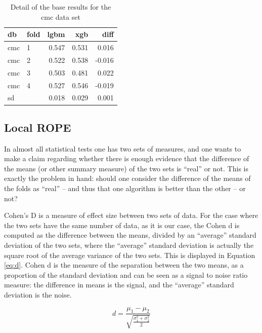 \documentclass[twoside,11pt,preprint]{article}
\begin{document}
\begin{table}

\caption{\label{tab:xsmall2}\label{tab:small2}Detail of the base results for the cmc data set}
\centering
\begin{tabular}[t]{llrrr}
\toprule
\textbf{db} & \textbf{fold} & \textbf{lgbm} & \textbf{xgb} & \textbf{diff}\\
\midrule
cmc & 1 & 0.547 & 0.531 & 0.016\\
cmc & 2 & 0.522 & 0.538 & -0.016\\
cmc & 3 & 0.503 & 0.481 & 0.022\\
cmc & 4 & 0.527 & 0.546 & -0.019\\
sd &  & 0.018 & 0.029 & 0.001\\
\bottomrule
\end{tabular}
\end{table}

\hypertarget{local-rope}{%
\subsection{\texorpdfstring{Local ROPE \label{localrope}}{Local ROPE }}\label{local-rope}}

In almost all statistical tests one has two sets of measures, and one
wants to make a claim regarding whether there is enough evidence that
the difference of the means (or other summary measure) of the two sets is ``real'' or not. This
is exactly the problem in hand: should one consider the difference of
the means of the folds as ``real'' -- and thus that one algorithm is
better than the other -- or not?

Cohen's D is a measure of effect size between two sets of data. For
the case where the two sets have the same number of data, as it is our
case, the Cohen d is computed as the difference between the means,
divided by an ``average'' standard deviation of the two sets, where the
``average'' standard deviation is actually the square root of the average
variance of the two sets. This is displayed in Equation \ref{eq:d}.
Cohen d is the measure of the separation between the two means, as a
proportion of the standard deviation and can be seen as a signal
to noise ratio measure: the difference in means is the signal, and the
``average'' standard deviation is the noise.

\begin{equation} \label{eq:d}
d = \frac{\mu_1 - \mu_2}{\sqrt{\frac{\sigma_1^2 + \sigma_2^2}{2}}} 
\end{equation}
\end{document}
